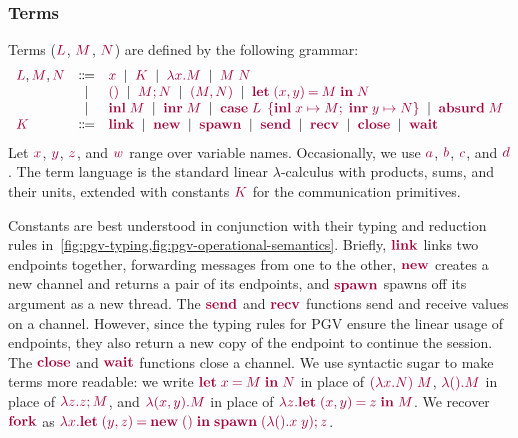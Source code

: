 \documentclass[main.tex]{subfiles}
\begin{document}
\subsubsection*{Terms}
Terms ($\tm{L}$, $\tm{M}$, $\tm{N}$) are defined by the following grammar:
\[
\begin{array}{lcl}
  \tm{L}, \tm{M}, \tm{N}
  & \Coloneqq & \tm{x}
    \sep        \tm{K}
    \sep        \tm{\lambda x.M}
    \sep        \tm{M\;N} \\
  & \sep      & \tm{\unit}
    \sep        \tm{\andthen{M}{N}}
    \sep        \tm{\pair{M}{N}}
    \sep        \tm{\letpair{x}{y}{M}{N}} \\
  & \sep      & \tm{\inl{M}}
    \sep        \tm{\inr{M}}
    \sep        \tm{\casesum{L}{x}{M}{y}{N}}
    \sep        \tm{\absurd{M}} \\
  \tm{K}
  & \Coloneqq & \tm{\link}
    \sep        \tm{\new}
    \sep        \tm{\spawn}
    \sep        \tm{\send}
    \sep        \tm{\recv}
    \sep        \tm{\close}
    \sep        \tm{\wait}
\end{array}
\]
Let $\tm{x}$, $\tm{y}$, $\tm{z}$, and $\tm{w}$ range over variable names. Occasionally, we use $\tm{a}$, $\tm{b}$, $\tm{c}$, and $\tm{d}$. The term language is the standard linear $\lambda$-calculus with products, sums, and their units, extended with constants $\tm{K}$ for the communication primitives. 

Constants are best understood in conjunction with their typing and reduction rules in~\cref{fig:pgv-typing,fig:pgv-operational-semantics}.
Briefly, $\tm{\link}$ links two endpoints together, forwarding messages from one to the other, $\tm{\new}$ creates a new channel and returns a pair of its endpoints, and $\tm{\spawn}$ spawns off its argument as a new thread.
The $\tm{\send}$ and $\tm{\recv}$ functions send and receive values on a channel.
However, since the typing rules for PGV ensure the linear usage of endpoints, they also return a new copy of the endpoint to continue the session.
The $\tm{\close}$ and $\tm{\wait}$ functions close a channel.
We use syntactic sugar to make terms more readable: we write $\tm{\letbind{x}{M}{N}}$ in place of $\tm{(\lambda x.N)\;M}$, $\tm{\lambda\unit.M}$ in place of $\tm{\lambda z.\andthen{z}{M}}$, and $\tm{\lambda\pair{x}{y}.M}$ in place of $\tm{\lambda z.\letpair{x}{y}{z}{M}}$.
We recover $\tm{\fork}$ as $\tm{\lambda x.\letpair{y}{z}{\new\;\unit}{\andthen{\spawn\;{(\lambda\unit.x\;y)}}{z}}}$.
\end{document}
